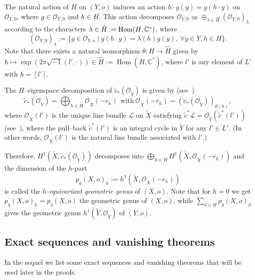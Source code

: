 \documentclass[12pt,a4paper]{amsart}
\DeclareMathOperator{\Hom}{Hom}
\def\CC{\mathbb{C}}
\def\cO{\mathcal{O}}
\theoremstyle{remark}
\theoremstyle{definition}
\begin{document}
The natural action of $H$ on $(Y,o)$ induces an action $h\cdot g(y)=g(h\cdot y)$ on $\cO_{Y,0}$, where $g\in \cO_{Y,0}$ and $h\in H$. This action decomposes $\cO_{Y,0}$ as $\oplus_{\lambda\in \hat{H}} (\cO_{Y,0})_{\lambda}$ according to the characters
$\lambda \in \hat{H}:={\rm Hom}(H,\CC^*)$, where
\begin{equation}
\label{eq:Heigenspaces}
(\cO_{Y,0})_{\lambda}:=\{g\in \cO_{Y,o} \mid g(h\cdot y)=\lambda (h)g(y),\ \forall y\in Y, h\in H\}.
\end{equation}
Note that there exists a natural isomorphism $\theta:H\to \hat{H}$ given by
$h\mapsto \exp(2\pi \sqrt{-1} (l',\cdot ))\in \hat{H}:= \Hom(H,\CC^*)$, where  $l' $ is any element of $L'$ with
$h=[l']$. 

The $H$--eigenspace decomposition of $\tilde c_{*}(\cO_{\tilde Y})$ is given by (see~\cite{Nem-PS,Okuma-abelian,nbook})
$$\tilde c_{*}(\cO_{\tilde Y})=\bigoplus_{h\in H}\cO_{\tilde X}(-r_h) \   \ \mbox{with} \
\cO_{\tilde X}(-r_h)=(\tilde c_{*}(\cO_{\tilde Y}))_{\theta(h)},$$
where $\cO_{\tilde X}(l')$ is the unique  line bundle $\mathcal L$ on $\tilde X$ satisfying
$\tilde c^*\mathcal L=\cO_{\tilde Y}(\tilde c^*(l'))$ (see~\cite[3.5]{Nem-CLB}), where the pull--back $\tilde c^*(l')$ is an integral cycle in $\tilde Y$ for any $l'\in L'$.
(In other words, $\cO_{\tilde X}(l')$ is the natural line bundle associated with $l'$.)

Therefore, $H^1(\tilde X, \tilde c_{*}(\cO_{\tilde Y}))$ decomposes into $\bigoplus_{h\in H}H^1(\tilde X,\cO_{\tilde X}(-r_h))$ and the dimension of the $h$-part
\begin{equation}\label{eq:eqgen}
p_g(X,o)_{h}:=h^1(\tilde X,\cO_{\tilde X}(-r_h))
\end{equation}
is called the \emph{$h$-equivariant geometric genus} of $(X,o)$. 
Note that for $h=0$ we get $p_g(X,o)_{h}=p_g(X,o)$ the geometric genus of $(X,o)$, while $\sum_{h\in H}p_g(X,o)_{h}$ gives the geometric genus $h^1(\tilde{Y}, \mathcal{O}_{\tilde{Y}})$
of $(Y,o)$.


\subsection{{\bf Exact sequences and vanishing theorems}}\label{ss:vanishingth} 
In the sequel we list some exact sequences and vanishing theorems that will be used later in the proofs.
\end{document}
